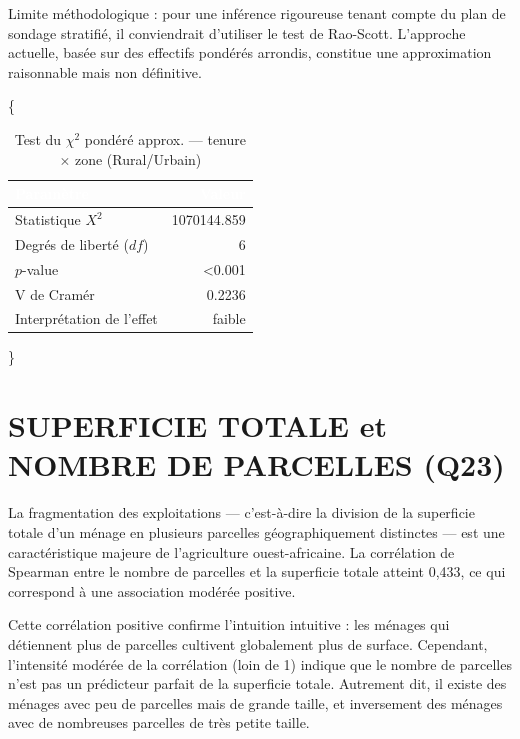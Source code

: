 \documentclass[
  french,
  10pt,
]{article}
\begin{document}
Limite méthodologique : pour une inférence rigoureuse tenant compte du
plan de sondage stratifié, il conviendrait d'utiliser le test de
Rao-Scott. L'approche actuelle, basée sur des effectifs pondérés
arrondis, constitue une approximation raisonnable mais non définitive.

\{ \small {}

\begin{table}

\caption{\label{tab:chi2-result}Test du $\chi^2$ pondéré approx. --- tenure $\times$ zone (Rural/Urbain)}
\centering
\begin{tabular}[t]{lr}
\toprule
\cellcolor{NavyBlue}\textcolor{white}{\textbf{Paramètre}} & \cellcolor{NavyBlue}\textcolor{white}{\textbf{Valeur}}\\
\midrule
Statistique $X^2$ & 1070144.859\\
Degrés de liberté ($df$) & 6\\
$p$-value & <0.001\\
V de Cramér & 0.2236\\
Interprétation de l'effet & faible\\
\bottomrule
\end{tabular}
\end{table}

\}

\section{SUPERFICIE TOTALE et NOMBRE DE PARCELLES
(Q23)}\label{superficie-totale-et-nombre-de-parcelles-q23}

La fragmentation des exploitations --- c'est-à-dire la division de la
superficie totale d'un ménage en plusieurs parcelles géographiquement
distinctes --- est une caractéristique majeure de l'agriculture
ouest-africaine. La corrélation de Spearman entre le nombre de parcelles
et la superficie totale atteint 0,433, ce qui correspond à une
association modérée positive.

Cette corrélation positive confirme l'intuition intuitive : les ménages
qui détiennent plus de parcelles cultivent globalement plus de surface.
Cependant, l'intensité modérée de la corrélation (loin de 1) indique que
le nombre de parcelles n'est pas un prédicteur parfait de la superficie
totale. Autrement dit, il existe des ménages avec peu de parcelles mais
de grande taille, et inversement des ménages avec de nombreuses
parcelles de très petite taille.
\end{document}
